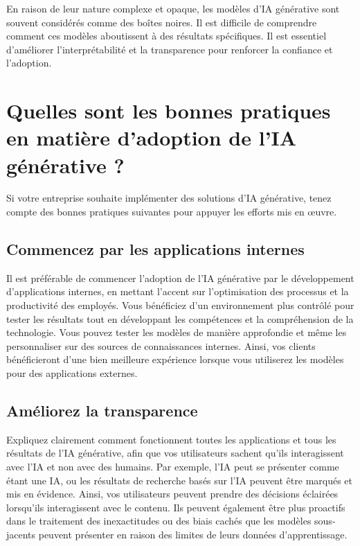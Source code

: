 En raison de leur nature complexe et opaque, les modèles d’IA générative sont souvent
considérés comme des boîtes noires. Il est difficile de comprendre comment ces
modèles aboutissent à des résultats spécifiques. Il est essentiel d’améliorer l’interprétabilité
et la transparence pour renforcer la confiance et l’adoption.

\section{Quelles sont les bonnes pratiques en matière d'adoption de l'IA
générative ?}

Si votre entreprise souhaite implémenter des solutions d'IA générative, tenez compte
des bonnes pratiques suivantes pour appuyer les efforts mis en œuvre.

\subsection*{Commencez par les applications internes}

Il est préférable de commencer l'adoption de l'IA générative par le
développement d'applications internes, en mettant l'accent sur l'optimisation des
processus et la productivité des employés. Vous bénéficiez d'un environnement
plus contrôlé pour tester les résultats tout en développant les compétences et
la compréhension de la technologie. Vous pouvez tester les modèles de manière approfondie
et même les personnaliser sur des sources de connaissances internes. Ainsi, vos clients
bénéficieront d’une bien meilleure expérience lorsque vous utiliserez les modèles
pour des applications externes.

\subsection*{Améliorez la transparence}

Expliquez clairement comment fonctionnent toutes les applications et tous les
résultats de l’IA générative, afin que vos utilisateurs sachent qu’ils interagissent
avec l’IA et non avec des humains. Par exemple, l'IA peut se présenter comme étant
une IA, ou les résultats de recherche basés sur l'IA peuvent être marqués et mis
en évidence. Ainsi, vos utilisateurs peuvent prendre des décisions éclairées
lorsqu'ils interagissent avec le contenu. Ils peuvent également être plus proactifs
dans le traitement des inexactitudes ou des biais cachés que les modèles sous-jacents
peuvent présenter en raison des limites de leurs données d'apprentissage.

